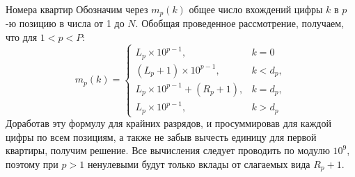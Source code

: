 \begin{tutorial}{Номера квартир}
Обозначим через $m_p(k)$ общее число вхождений цифры $k$ в $p$-ю позицию в числа от 1 до $N$. Обобщая проведенное рассмотрение, получаем, что для $1 < p < P$:
$$
m_p(k)
 =\left\{
 \begin{array}{ll}
L_p \times 10^{p-1}, & k=0\\
(L_p + 1) \times 10^{p-1}, & k < d_p,\\
L_p \times 10^{p-1} + (R_p + 1), & k = d_p,\\
L_p \times 10^{p-1}, & k > d_p
\end{array}
\right.
$$
Доработав эту формулу для крайних разрядов, и просуммировав для каждой цифры по всем позициям, а также не забыв вычесть единицу для первой квартиры, получим решение. Все вычисления следует проводить по модулю $10^9$, поэтому при $p>1$ ненулевыми будут только вклады от слагаемых вида $R_p+1$.


\end{tutorial}
